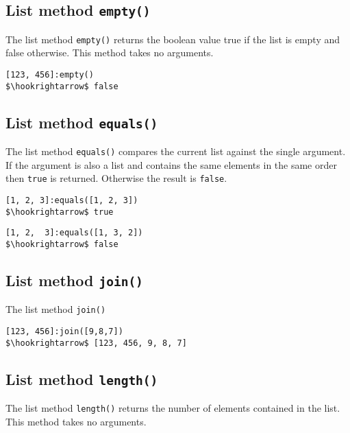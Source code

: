 \documentclass[11pt,a4paper]{scrbook}
\newcommand\keyword[1]{\texttt{#1}}
\newcommand\method[1]{\texttt{#1}}
\begin{document}
\subsection{List method \method{empty()}}

The list method \method{empty()} returns the boolean value true if the list is
empty and false otherwise. This method takes no arguments.

\begin{lstlisting}[language=BibTool,mathescape=true]
[123, 456]:empty()
$\hookrightarrow$ false
\end{lstlisting}

\subsection{List method \method{equals()}}

The list method \method{equals()} compares the current list against the single
argument. If the argument is also a list and contains the same elements in the
same order then \keyword{true} is returned. Otherwise the result is
\keyword{false}.

\begin{lstlisting}[language=BibTool,mathescape=true]
[1, 2, 3]:equals([1, 2, 3])
$\hookrightarrow$ true
\end{lstlisting}

\begin{lstlisting}[language=BibTool,mathescape=true]
[1, 2,  3]:equals([1, 3, 2])
$\hookrightarrow$ false
\end{lstlisting}

\subsection{List method \method{join()}}

The list method \method{join()}

\begin{lstlisting}[language=BibTool,mathescape=true]
[123, 456]:join([9,8,7])
$\hookrightarrow$ [123, 456, 9, 8, 7]
\end{lstlisting}

\subsection{List method \method{length()}}

The list method \method{length()} returns the number of elements contained in
the list. This method takes no arguments.
\end{document}
